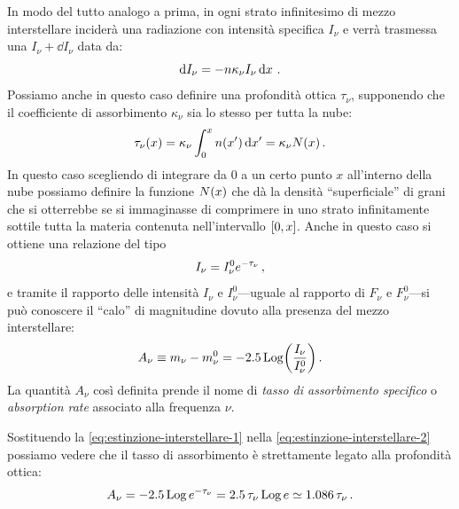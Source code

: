         In modo del tutto analogo a prima, in ogni strato infinitesimo di mezzo interstellare inciderà una radiazione con intensità specifica $I_\nu$ e verrà trasmessa una $I_\nu + \dd{I_\nu}$ data da:
        \begin{equation}
            \dd{I_\nu} = - n\kappa_{\nu}I_{\nu}\dd{x}
            \,.
        \end{equation}
        Possiamo anche in questo caso definire una profondità ottica $\tau_\nu$, supponendo che il coefficiente di assorbimento $\kappa_\nu$ sia lo stesso per tutta la nube:
        \begin{equation*}
            \tau_\nu\pqty{x}
            = \kappa_\nu\int_{0}^{x}n\pqty{x'}\dd{x'}
            = \kappa_\nu N\pqty{x}
            \myperiod
        \end{equation*}
        In questo caso scegliendo di integrare da $0$ a un certo punto $x$ all'interno della nube possiamo definire la funzione $N\pqty{x}$ che dà la densità ``superficiale'' di grani che si otterrebbe se si immaginasse di comprimere in uno strato infinitamente sottile tutta la materia contenuta nell'intervallo $\bqty{0,x}$. Anche in questo caso si ottiene una relazione del tipo
        \begin{equation}
            \label{eq:estinzione-interstellare-1}
            I_\nu = I_\nu^0 e^{-\tau_\nu}
            \,,
        \end{equation}
        e tramite il rapporto delle intensità $I_\nu$ e $I_\nu^0$---uguale al rapporto di $F_\nu$ e $F_\nu^0$---si può conoscere il ``calo'' di magnitudine dovuto alla presenza del mezzo interstellare:
        \begin{equation}
            \label{eq:estinzione-interstellare-2}
            A_\nu
            \equiv m_\nu - m_\nu^0
            = -2.5\Log\!\pqty{\frac{I_\nu}{I_\nu^0}}
            \myperiod
        \end{equation}
        La quantità $A_\nu$ così definita prende il nome di \emph{tasso di assorbimento specifico} o \emph{absorption rate} associato alla frequenza $\nu$.

        Sostituendo la \eqref{eq:estinzione-interstellare-1} nella \eqref{eq:estinzione-interstellare-2} possiamo vedere che il tasso di assorbimento è strettamente legato alla profondità ottica:
        \begin{equation*}
            A_\nu
            = \num{-2.5}\operatorname{Log} e^{-\tau_\nu}
            = \num{2.5}\,\tau_\nu\operatorname{Log} e
            \simeq \num{1.086}\,\tau_\nu
            \,.
        \end{equation*}

